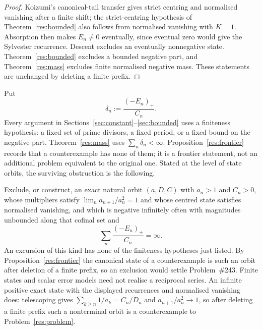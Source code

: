 \documentclass[11pt]{article}
\begin{document}
\begin{proof}
Koizumi's canonical-tail transfer gives strict centring and normalised
vanishing after a finite shift; the strict-centring hypothesis of
Theorem~\ref{res:bounded} also follows from normalised vanishing with $K=1$.
Absorption then makes $E_n\ne0$ eventually,
since eventual zero would give the Sylvester recurrence.  Descent excludes an
eventually nonnegative state.  Theorem~\ref{res:bounded} excludes a bounded
negative part, and Theorem~\ref{res:mass} excludes finite normalised negative
mass.  These statements are unchanged by deleting a finite prefix.
\end{proof}

Put
\[
 \delta_n:=\frac{(-E_n)_+}{C_n}.
\]
Every argument in Sections~\ref{sec:constant}--\ref{sec:bounded} uses a
finiteness hypothesis: a fixed set of prime divisors, a fixed period, or a
fixed bound on the negative part.  Theorem~\ref{res:mass} uses
$\sum_n\delta_n<\infty$.  Proposition~\ref{res:frontier} records that a
counterexample has none of them; it is a frontier statement, not an additional
problem equivalent to the original one.  Stated at the level of state orbits,
the surviving obstruction is the following.

\begin{problem}\label{res:excursions}
Exclude, or construct, an exact natural orbit $(a,D,C)$ with $a_n>1$ and
$C_n>0$, whose multipliers satisfy $\lim_n a_{n+1}/a_n^{2}=1$ and whose centred
state satisfies normalised vanishing, and which is
negative infinitely often with magnitudes unbounded along that cofinal set and
\[
 \sum_n\frac{(-E_n)_+}{C_n}=\infty .
\]
An excursion of this kind has none of the finiteness hypotheses just listed.
By Proposition~\ref{res:frontier} the canonical state of a counterexample is
such an orbit after deletion of a finite prefix, so an exclusion would settle
Problem~\#243.  Finite states and scalar error models need not realise a
reciprocal series.  An infinite positive exact state with the displayed
recurrences and normalised vanishing does: telescoping gives
$\sum_{k\ge n}1/a_k=C_n/D_n$ and $a_{n+1}/a_n^2\to1$, so after deleting a
finite prefix such a nonterminal orbit is a counterexample to
Problem~\ref{res:problem}.
\end{problem}
\end{document}
